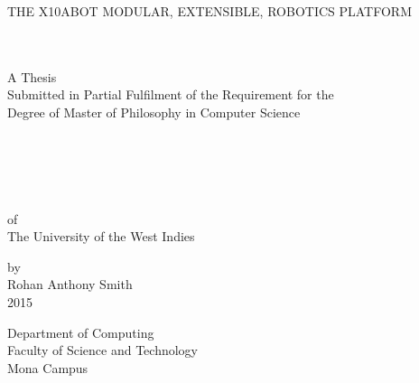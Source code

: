 \documentclass[a4paper, 12pt, oneside]{Thesis}
\begin{document}
\newcommand{\xten}{\texttt{X10ABOT} }
\newcommand{\reg}{\textsuperscript{\textregistered}}
\newcommand{\lego}{LEGO\reg }
\newcommand{\iic}{I$^2$C }


\pagestyle{fancy}
\frontmatter

\begin{titlepage}
\singlespacing
\begin{center}

{\uppercase{The X10ABOT Modular, Extensible, Robotics Platform}}
\mbox{ }\\ 
\mbox{ }\\ 
\mbox{ }\\ 
\begin{center}
A Thesis\\ 
Submitted in Partial Fulfilment of the Requirement for the \\
Degree of Master of Philosophy in Computer Science\\
\mbox{ }\\ 
\mbox{ }\\ 
\mbox{ }\\ 
\mbox{ }\\ 
\mbox{ }\\ 
of\\
The University of the West Indies\\
\end{center}
\vfill
by\\
Rohan Anthony Smith\\
2015\\
\end{center}
Department of Computing\\
Faculty of Science and Technology\\
Mona Campus

\end{titlepage}


\end{document}
